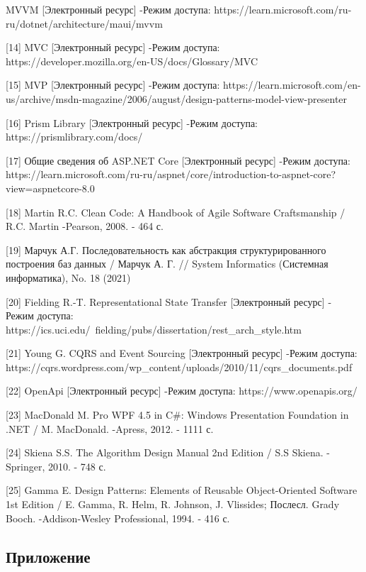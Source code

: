 \documentclass[12pt]{article}
\newcommand{\anonsection}[1]{\section*{#1}\addcontentsline{toc}{section}{#1}}
\begin{document}
\begin{flushleft}
    [13] MVVM [Электронный ресурс] -Режим доступа: https://learn.microsoft.com/ru-ru/dotnet/architecture/maui/mvvm

    [14] MVC [Электронный ресурс] -Режим доступа: https://developer.mozilla.org/en-US/docs/Glossary/MVC

    [15] MVP [Электронный ресурс] -Режим доступа: https://learn.microsoft.com/en-us/archive/msdn-magazine/2006/august/design-patterns-model-view-presenter

    [16] Prism Library [Электронный ресурс] -Режим доступа: https://prismlibrary.com/docs/

    [17] Общие сведения об ASP.NET Core [Электронный ресурс] -Режим доступа: https://learn.microsoft.com/ru-ru/aspnet/core/introduction-to-aspnet-core?view=aspnetcore-8.0

    [18] Martin R.C. Clean Code: A Handbook of Agile Software Craftsmanship / R.C. Martin -Pearson, 2008. - 464 с.

    [19] Марчук А.Г. Последовательность как абстракция структурированного построения баз данных / Марчук А. Г. // System Informatics (Системная информатика), No. 18 (2021)

    [20] Fielding R.-T. Representational State Transfer [Электронный ресурс] - Режим доступа:  https://ics.uci.edu/~fielding/pubs/dissertation/rest\_arch\_style.htm

    [21] Young G. CQRS and Event Sourcing [Электронный ресурс] -Режим доступа: https://cqrs.wordpress.com/wp\_content/uploads/2010/11/cqrs\_documents.pdf

    [22] OpenApi [Электронный ресурс] -Режим доступа: https://www.openapis.org/

    [23] MacDonald M. Pro WPF 4.5 in C\#: Windows Presentation Foundation in .NET / M. MacDonald. -Apress, 2012. - 1111 с.

    [24] Skiena S.S. The Algorithm Design Manual 2nd Edition / S.S Skiena. -Springer, 2010. - 748 с.

    [25] Gamma E. Design Patterns: Elements of Reusable Object-Oriented Software 1st Edition / E. Gamma, R. Helm, R. Johnson, J. Vlissides; Послесл. Grady Booch. -Addison-Wesley Professional, 1994. - 416 с.

\end{flushleft}

\pagebreak

\begin{center}
    {\anonsection{Приложение}}
\end{center}
\end{document}
